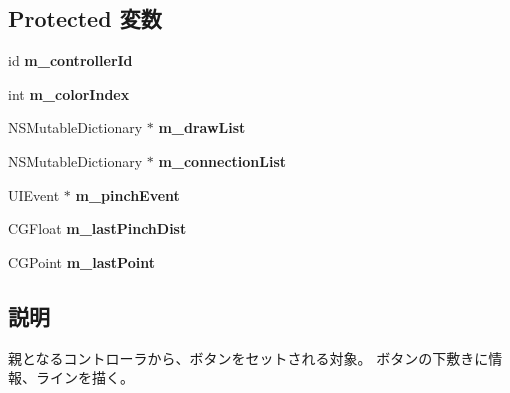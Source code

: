 \subsection*{Protected 変数}
\begin{DoxyCompactItemize}
\item 
\hypertarget{interface_messenger_display_view_aa560737c094fbfbca64d1a52724a307e}{
id {\bfseries m\_\-controllerId}}
\label{d8/d39/interface_messenger_display_view_aa560737c094fbfbca64d1a52724a307e}

\item 
\hypertarget{interface_messenger_display_view_a9329c2b1bc22938abd84560c9a66c89d}{
int {\bfseries m\_\-colorIndex}}
\label{d8/d39/interface_messenger_display_view_a9329c2b1bc22938abd84560c9a66c89d}

\item 
\hypertarget{interface_messenger_display_view_a34409905c6603a9a5084c5248cb3fc2a}{
NSMutableDictionary $\ast$ {\bfseries m\_\-drawList}}
\label{d8/d39/interface_messenger_display_view_a34409905c6603a9a5084c5248cb3fc2a}

\item 
\hypertarget{interface_messenger_display_view_a0b6812fc7734e00008e374c06475511b}{
NSMutableDictionary $\ast$ {\bfseries m\_\-connectionList}}
\label{d8/d39/interface_messenger_display_view_a0b6812fc7734e00008e374c06475511b}

\item 
\hypertarget{interface_messenger_display_view_a1784971ff728fd49f87867555f0d13f9}{
UIEvent $\ast$ {\bfseries m\_\-pinchEvent}}
\label{d8/d39/interface_messenger_display_view_a1784971ff728fd49f87867555f0d13f9}

\item 
\hypertarget{interface_messenger_display_view_a6b0dad3517ee8881c3d4e50c3a130054}{
CGFloat {\bfseries m\_\-lastPinchDist}}
\label{d8/d39/interface_messenger_display_view_a6b0dad3517ee8881c3d4e50c3a130054}

\item 
\hypertarget{interface_messenger_display_view_a13352f8ffc249726f73fcce007df21d0}{
CGPoint {\bfseries m\_\-lastPoint}}
\label{d8/d39/interface_messenger_display_view_a13352f8ffc249726f73fcce007df21d0}

\end{DoxyCompactItemize}


\subsection{説明}
親となるコントローラから、ボタンをセットされる対象。 ボタンの下敷きに情報、ラインを描く。 

